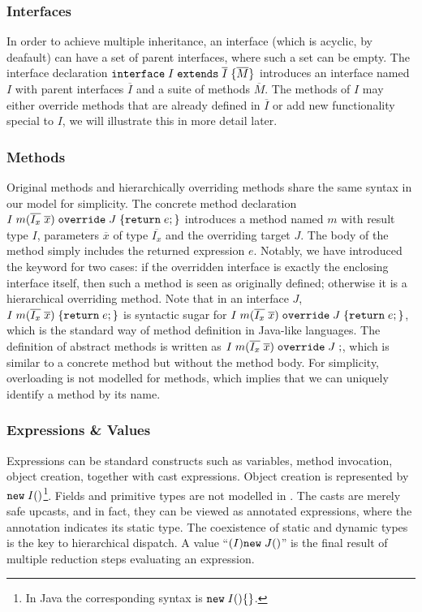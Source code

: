 \subsubsection{Interfaces}
In order to achieve multiple inheritance, an interface (which is acyclic, by deafault) can have a set of 
parent interfaces, where such a set can be empty. The interface declaration $\texttt{interface} \; I \; \texttt{extends} \; \overline{I} \; {\{} \overline{M} {\}}$ introduces an interface named $I$ with parent interfaces $\overline{I}$ and a suite of methods $\overline{M}$. The methods of $I$ may either override methods that are already defined in $\overline{I}$ or add new functionality special to $I$, we will illustrate this in more detail later.

\subsubsection{Methods}
Original methods and hierarchically overriding methods share the same syntax in our model for simplicity.
The concrete method declaration $I \; m (\overline{I_x} \; \overline{x}) \; \texttt{override} \; J \; {\{} \texttt{return} \; e ; {\}}$ introduces a
method named $m$ with result type $I$, parameters $\overline{x}$ of
type $\overline{I_x}$ and the overriding target $J$. The body of the
method simply includes the returned expression $e$. Notably, we have introduced the
\kwoverride{} keyword for two cases: if the overridden interface is exactly the enclosing
interface itself, then such a method is seen as originally defined; otherwise it is a hierarchical overriding method. 
Note that in an interface $J$, $
I \; m(\overline{I_x} \; \overline{x}) \; {\{} \texttt{return} \; e ; {\}} $ is syntactic sugar for $I \; m (\overline{I_x} \; \overline{x}) \; \texttt{override} \; J \; {\{} \texttt{return} \; e ; {\}}$, which is the standard way of method definition in Java-like languages. The definition
of abstract methods is written as $I \; m (\overline{I_x} \; \overline{x}) \; \texttt{override} \; J \; ;$, which is
similar to a concrete method but without the method body. 
For simplicity, overloading is not modelled for methods, which
implies that we can uniquely identify a method by its name.

\subsubsection{Expressions \& Values}
Expressions can be standard constructs such as variables, method
invocation, object creation, together with cast expressions. 
Object creation is represented by $\texttt{new} \; I()$\footnote{In Java the corresponding syntax is $\texttt{new} \; I()\{\}$.}. Fields and primitive types are not modelled in \MIM{}. 
The casts are merely safe upcasts, and in fact, they can be viewed as
annotated expressions, where the annotation indicates its static type.
The coexistence of static and dynamic types is the key to hierarchical dispatch.
A value
``$(I)\texttt{new} \; J()$''
is the final result of multiple reduction steps evaluating an
expression.

